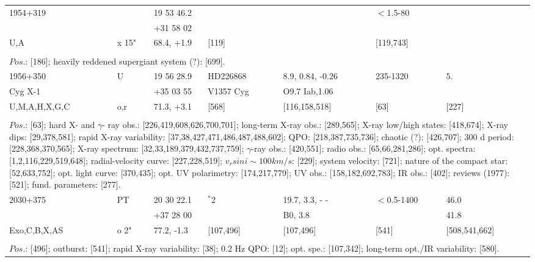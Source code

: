 \documentclass{aa}
\begin{document}
\begin{table*}[h]
\begin{tabular}{p{2.5cm}p{1cm}p{1.8cm}p{2.3cm}p{3.3cm}p{2.0cm}p{2.2cm}}
\noalign{\smallskip}
\hline
\noalign{\smallskip}
 1954+319     &                & 19 53 46.2      &                         &                      & $<$1.5-80         &          \\
                        &                & +31 58 02       &                         &                      &                            &          \\
U,A                 & x 15"     & 68.4, +1.9        &   [119]             &                      & [119,743]        &          \\
\\
\multicolumn{7}{p{17.5cm}}{
$Pos$.: [186]; heavily reddened supergiant system (?): [699].}\\

\noalign{\smallskip}
\hline
\noalign{\smallskip}
 1956+350     & U        & 19 56 28.9      & HD226868           & 8.9, 0.84, -0.26     &  235-1320     & 5.         \\
 Cyg X-1        &            & +35 03 55       &  V1357 Cyg         & O9.7 Iab,1.06       &                        &             \\
U,M,A,H,X,G,C    &  o,r     & 71.3, +3.1       &     [568]                 & [116,158,518]       &        [63]         &  [227]  \\
\\
\multicolumn{7}{p{17.5cm}}{
$Pos$.: [63]; hard X- and $\gamma$- ray obs.: [226,419,608,626,700,701]; long-term X-ray obs.: [289,565]; 
X-ray low/high states: [418,674]; X-ray dips: [29,378,581]; rapid X-ray variability: [37,38,427,471,486,487,488,602];
QPO: [218,387,735,736]; chaotic (?): [426,707]; 300 d period: [228,368,370,565]; X-ray spectrum: 
[32,33,189,379,432,737,759]; $\gamma$-ray obs.: [420,551];  
radio obs.: [65,66,281,286]; opt. spectra: [1,2,116,229,519,648]; radial-velocity curve: [227,228,519];  
$v_rsin i \sim 100 km/s$: [229]; system velocity: [721]; nature of the compact star: [52,633,752];  
opt. light curve: [370,435]; opt. UV polarimetry: [174,217,779]; UV obs.: [158,182,692,783]; IR obs.: [402]; 
reviews (1977): [521]; fund. parameters: [277]. }\\

\noalign{\smallskip}
\hline
\noalign{\smallskip}
2030+375   & PT       & 20 30 22.1     & $^*$2                & 19.7, 3.3, - -           & $<$0.5-1400        & 46.0                        \\
                     &             & +37 28 00       &                           &  B0, 3.8                  &                               & 41.8                        \\
Exo,C,B,X,AS & o 2"  & 77.2, -1.3    & [107,496]         &  [107,496]               & [541]                    & [508,541,662]   \\
\\
\multicolumn{7}{p{17.5cm}}{
$Pos$.: [496]; outburst: [541]; rapid X-ray variability: [38]; 0.2 Hz QPO: [12]; opt. spe.: [107,342]; 
long-term opt./IR variability: [580].}\\


\end{tabular}
\end{table*}
\end{document}
